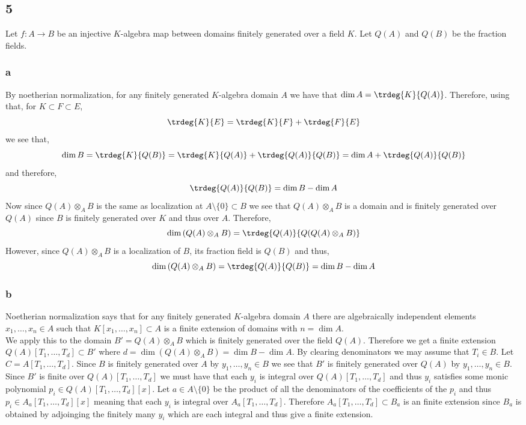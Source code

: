 \documentclass[12pt]{article}
\begin{document}
\subsection{5}

Let $f : A \to B$ be an injective $K$-algebra map between domains finitely generated over a field $K$. Let $Q(A)$ and $Q(B)$ be the fraction fields.

\subsubsection{a}

By noetherian normalization, for any finitely generated $K$-algebra domain $A$ we have that $\dim{A} = \trdeg{K}{Q(A)}$. Therefore, using that, for $K \subset F \subset E$,
\[ \trdeg{K}{E} = \trdeg{K}{F} + \trdeg{F}{E} \]
we see that,
\[ \dim{B} = \trdeg{K}{Q(B)} = \trdeg{K}{Q(A)} + \trdeg{Q(A)}{Q(B)} = \dim{A} + \trdeg{Q(A)}{Q(B)} \]
and therefore,
\[ \trdeg{Q(A)}{Q(B)} = \dim{B} - \dim{A} \]
Now since $Q(A) \otimes_A B$ is the same as localization at $A \setminus \{ 0 \} \subset B$ we see that $Q(A) \otimes_A B$ is a domain and is finitely generated over $Q(A)$ since $B$ is finitely generated over $K$ and thus over $A$. Therefore,
\[ \dim{(Q(A) \otimes_A B)} = \trdeg{Q(A)}{Q(Q(A) \otimes_A B)} \]
However, since $Q(A) \otimes_A B$ is a localization of $B$, its fraction field is $Q(B)$ and thus,
\[ \dim{(Q(A) \otimes_A B)} = \trdeg{Q(A)}{Q(B)} = \dim{B} - \dim{A} \]

\subsubsection{b}

Noetherian normalization says that for any finitely generated $K$-algebra domain $A$ there are algebraically independent elements $x_1, \dots, x_n \in A$ such that $K[x_1, \dots, x_n] \subset A$ is a finite extension of domains with $n = \dim{A}$.
\bigskip\\
We apply this to the domain $B' = Q(A) \otimes_A B$ which is finitely generated over the field $Q(A)$. Therefore we get a finite extension $Q(A)[T_1, \dots, T_d] \subset B'$ where $d = \dim{(Q(A) \otimes_A B)} = \dim{B} - \dim{A}$. By clearing denominators we may assume that $T_i \in B$. Let $C = A[T_1, \dots, T_d]$. Since $B$ is finitely generated over $A$ by $y_1, \dots, y_n \in B$ we see that $B'$ is finitely generated over $Q(A)$ by $y_1, \dots, y_n \in B$. Since $B'$ is finite over $Q(A)[T_1, \dots, T_d]$ we must have that each $y_i$ is integral over $Q(A)[T_1, \dots, T_d]$ and thus $y_i$ satisfies some monic polynomial $p_i \in Q(A)[T_1, \dots, T_d][x]$. Let $a \in A \setminus \{ 0 \}$ be the product of all the denominators of the coefficients of the $p_i$ and thus $p_i \in A_a[T_1, \dots, T_d][x]$ meaning that each $y_i$ is integral over $A_a[T_1, \dots, T_d]$. Therefore $A_a[T_1, \dots, T_d] \subset B_a$ is an finite extension since $B_a$ is obtained by adjoinging the finitely many $y_i$ which are each integral and thus give a finite extension.
\end{document}
